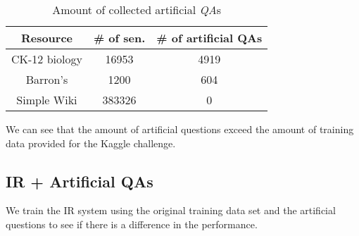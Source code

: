 \begin{table}[htp]
\caption{Amount of collected artificial \emph{QA}s}
\begin{center}
\begin{tabular}{|c|c|c|}
\hline
Resource&\# of sen.& \# of artificial QAs\\
\hline
CK-12 biology & 16953 & 4919\\
Barron's & 1200 & 604 \\
Simple Wiki & 383326 & 0\\
\hline
\end{tabular}
\end{center}
\label{artificialqa}
\end{table}%

We can see that the amount of artificial questions exceed the amount of training data provided for the Kaggle challenge.

\subsection{IR + Artificial QAs}
We train the IR system using the original training data set and the artificial questions to see if there is a difference in the performance.
